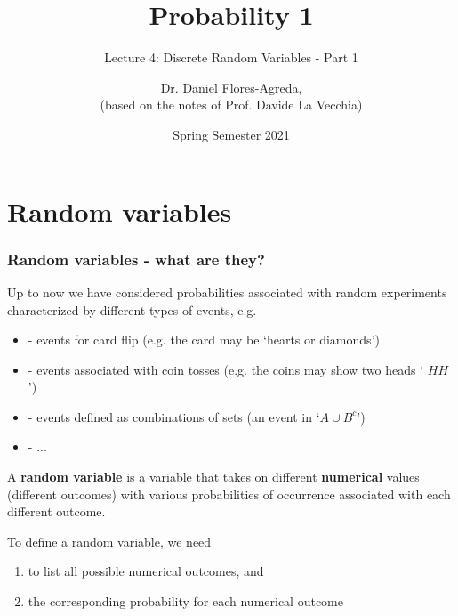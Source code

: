 \documentclass[notes=show,smaller]{beamer}\usepackage[]{graphicx}\usepackage[]{color}
\newenvironment{stepenumerate}{\begin{enumerate}[<+->]}{\end{enumerate}}
\newenvironment{stepitemize}{\begin{itemize}[<+->]}{\end{itemize} }
\begin{document}
\title[S110015]{Probability 1}
\subtitle{Lecture 4: Discrete Random Variables - Part 1}
\author[Flores-Agreda, La Vecchia]{Dr. Daniel Flores-Agreda, \\[0.5em] \tiny{(based on the notes of Prof. Davide La Vecchia)}}
\date{Spring Semester 2021}

\begin{frame}{\secname}
\titlepage
\end{frame}

\section{Random variables}

\begin{frame}{\secname}

\frametitle{Random variables - what are they?}

Up to now we have considered probabilities associated with random
experiments characterized by different types of events, e.g.

\vspace{0.4cm}

\begin{stepitemize}
\item[-] events for card flip (e.g. the card may be `hearts or diamonds')

\item[-] events associated with coin tosses (e.g. the coins may show two heads `%
$HH$')

\item[-] events defined as combinations of sets (an event in `$A\cup B^{c}$')
\item[-]...
\end{stepitemize}

\begin{definition}

A \textbf{random variable} is a variable that takes on different
\textbf{numerical} values (different outcomes) with various probabilities of
occurrence associated with each different outcome. \\
\vspace{0.4cm}
\end{definition}

To define a random variable, we need

\begin{stepenumerate}
\item to list all possible numerical outcomes, and

\item the corresponding probability for each numerical outcome
\end{stepenumerate}


\end{frame}%
\end{document}
